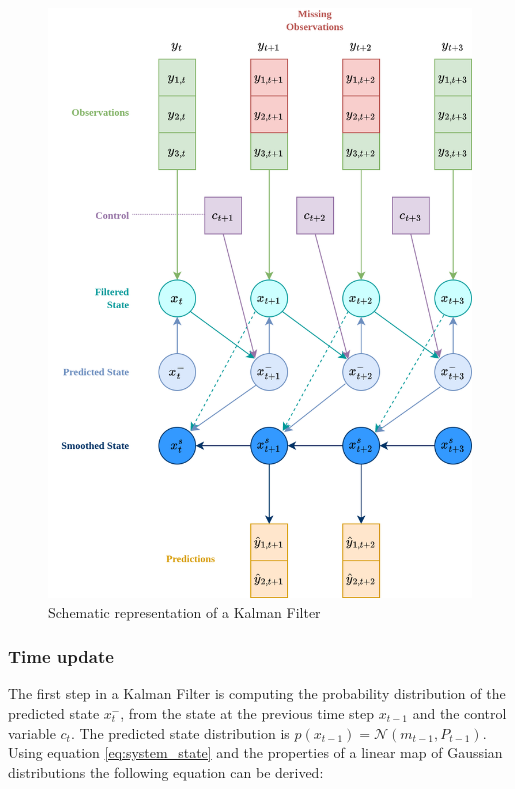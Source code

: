 \documentclass{article}
\begin{document}
\begin{figure}
\includegraphics[width=\textwidth]{Kalman Filter figure.png}
\caption{Schematic representation of a Kalman Filter}
\label{fig:kalman_filter}
\end{figure}

\subsubsection{Time update}

The first step in a Kalman Filter is computing the probability distribution of the predicted state $x^-_t$, from the state at the previous time step $x_{t-1}$ and the control variable $c_t$. The predicted state distribution is $p(x_{t-1}) = \mathcal{N}(m_{t-1}, P_{t-1})$.  Using equation \ref{eq:system_state} and the properties of a linear map of Gaussian distributions the following equation can be derived:
\end{document}
